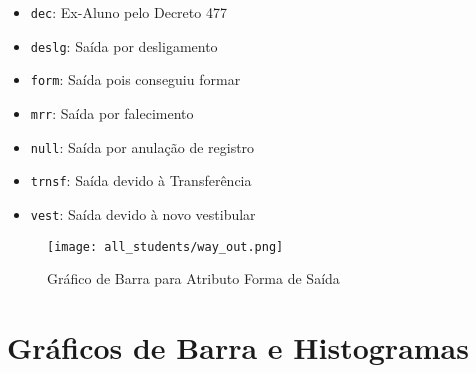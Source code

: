     \begin{itemize}
    \item \texttt{dec}: Ex-Aluno pelo Decreto 477
    \item \texttt{deslg}: Saída por desligamento
    \item \texttt{form}: Saída pois conseguiu formar
    \item \texttt{mrr}: Saída por falecimento
    \item \texttt{null}: Saída por anulação de registro
    \item \texttt{trnsf}: Saída devido à Transferência
    \item \texttt{vest}: Saída devido à novo vestibular
    \end{itemize}

    \begin{figure}[!ht]
    \caption{Gráfico de Barra para Atributo Forma de Saída}
    \centering
    \texttt{[image: all\_students/way\_out.png]}
    \label{atr_way_out_org}
    \end{figure}

\section{Gráficos de Barra e Histogramas} \label{graf_bar_hist}

